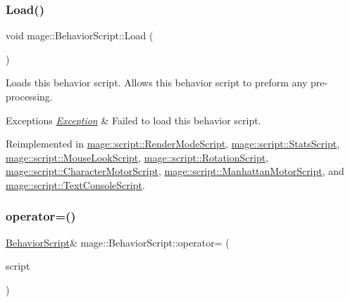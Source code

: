 \subsubsection{\texorpdfstring{Load()}{Load()}}
{\footnotesize\ttfamily void mage\+::\+Behavior\+Script\+::\+Load (\begin{DoxyParamCaption}{ }\end{DoxyParamCaption})\hspace{0.3cm}{\ttfamily [virtual]}}

Loads this behavior script. Allows this behavior script to preform any pre-\/processing.


\begin{DoxyExceptions}{Exceptions}
{\em \hyperlink{classmage_1_1_exception}{Exception}} & Failed to load this behavior script. \\
\hline
\end{DoxyExceptions}


Reimplemented in \hyperlink{classmage_1_1script_1_1_render_mode_script_ab116aa499231f34dbc61b69e121e2e49}{mage\+::script\+::\+Render\+Mode\+Script}, \hyperlink{classmage_1_1script_1_1_stats_script_aae0d11d30f1242d1f8d569b5b0894343}{mage\+::script\+::\+Stats\+Script}, \hyperlink{classmage_1_1script_1_1_mouse_look_script_a4b26f1ac71e89eaac7903101b95745e9}{mage\+::script\+::\+Mouse\+Look\+Script}, \hyperlink{classmage_1_1script_1_1_rotation_script_a7a632d323f57f4f2f19c0562bd0656e1}{mage\+::script\+::\+Rotation\+Script}, \hyperlink{classmage_1_1script_1_1_character_motor_script_aa07409b305e1766b69134f7884be7395}{mage\+::script\+::\+Character\+Motor\+Script}, \hyperlink{classmage_1_1script_1_1_manhattan_motor_script_aea733198d0f4b6e46815c3b91c3e8751}{mage\+::script\+::\+Manhattan\+Motor\+Script}, and \hyperlink{classmage_1_1script_1_1_text_console_script_aaa7ab7c1859adc6532b6191c205d44ef}{mage\+::script\+::\+Text\+Console\+Script}.

\hypertarget{classmage_1_1_behavior_script_a0b3327ebf7009e668a7022d254cb1d51}{}\label{classmage_1_1_behavior_script_a0b3327ebf7009e668a7022d254cb1d51} 
\subsubsection{\texorpdfstring{operator=()}{operator=()}\hspace{0.1cm}{\footnotesize\ttfamily [1/2]}}
{\footnotesize\ttfamily \hyperlink{classmage_1_1_behavior_script}{Behavior\+Script}\& mage\+::\+Behavior\+Script\+::operator= (\begin{DoxyParamCaption}\item[{const \hyperlink{classmage_1_1_behavior_script}{Behavior\+Script} \&}]{script }\end{DoxyParamCaption})\hspace{0.3cm}{\ttfamily [delete]}}

